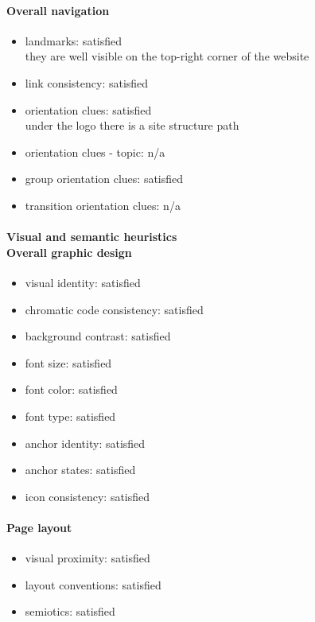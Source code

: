 \begin{enumerate}
	\paragraph*{Overall navigation}
	\begin{itemize}
		\item landmarks: satisfied\\
		they are well visible on the top-right corner of the website 
		\item link consistency: satisfied
		\item orientation clues: satisfied\\
		under the logo there is a site structure path
		\item orientation clues - topic: n/a
		\item group orientation clues: satisfied
		\item transition orientation clues: n/a
	\end{itemize}	
	
	\paragraph*{Visual and semantic heuristics \\ Overall graphic design }
	\begin{itemize}
		\item visual identity: satisfied
		\item chromatic code consistency: satisfied
		\item background contrast: satisfied
		\item font size: satisfied
		\item font color: satisfied
		\item font type: satisfied
		\item anchor identity: satisfied
		\item anchor states: satisfied
		\item icon consistency: satisfied
	\end{itemize}
	
	\paragraph*{Page layout}
	\begin{itemize}
		\item visual proximity: satisfied
		\item layout conventions: satisfied
		\item semiotics: satisfied
	\end{itemize}	
	

\end{enumerate}
